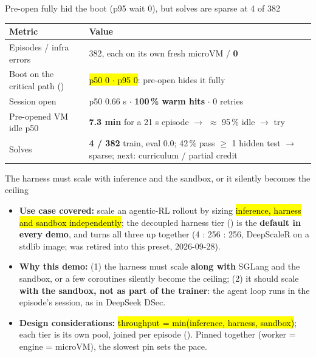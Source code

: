 \begin{frame}{Pre-open fully hid the boot (p95 wait 0), but solves are sparse at 4 of 382}
\footnotesize\renewcommand{\arraystretch}{1.15}
\begin{tabularx}{\textwidth}{@{}p{} Y@{}}
\toprule
\textbf{Metric} & \textbf{Value}\\
\midrule
Episodes / infra errors & 382, each on its own fresh microVM / \textbf{0}\\
Boot on the critical path () & \hl{p50 0 $\cdot$ p95 0}: pre-open hides it fully\\
Session open & p50 0.66 s $\cdot$ \textbf{100\,\% warm hits} $\cdot$ 0 retries\\
Pre-opened VM idle p50 & \textbf{7.3 min} for a 21 s episode $\rightarrow$ $\approx$ 95\,\% idle $\rightarrow$ try \\
Solves & \textbf{4 / 382} train, eval 0.0; 42\,\% pass $\ge$ 1 hidden test $\rightarrow$ sparse; next: curriculum / partial credit\\
\bottomrule
\end{tabularx}
\par\vspace{3mm}
\end{frame}


\begin{frame}{The harness must scale with inference and the sandbox, or it silently becomes the ceiling}
\begin{itemize}\footnotesize\setlength{\itemsep}{2mm}
\item \textbf{Use case covered:} scale an agentic-RL rollout by sizing \hl{inference, harness and sandbox independently}; the decoupled harness tier () is the \textbf{default in every demo}, and  turns all three up together (4 : 256 : 256, DeepScaleR on a stdlib image;  was retired into this preset, 2026-09-28).
\item \textbf{Why this demo:} (1) the harness must scale \textbf{along with} SGLang and the sandbox, or a few coroutines silently become the ceiling; (2) it should scale \textbf{with the sandbox, not as part of the trainer}: the agent loop runs in the episode's session, as in DeepSeek DSec.
\item \textbf{Design considerations:} \hl{throughput = min(inference, harness, sandbox)}; each tier is its own pool, joined per episode (). Pinned together (worker = engine = microVM), the slowest pin sets the pace.
\end{itemize}
\end{frame}

